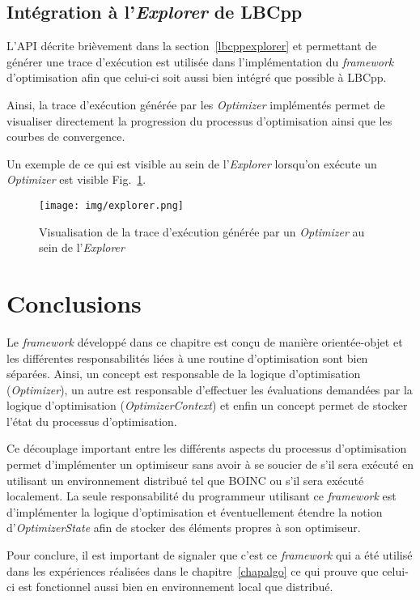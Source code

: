 \documentclass[a4paper, 12pt]{report}
\begin{document}

\subsection{Intégration à l'\textit{Explorer} de LBCpp}
L'API décrite brièvement dans la section~\ref{lbcppexplorer} et permettant de générer une trace d'exécution est utilisée dans l'implémentation du \textit{framework} d'optimisation afin que celui-ci soit aussi bien intégré que possible à LBCpp. 

Ainsi, la trace d'exécution générée par les \textit{Optimizer} implémentés permet de visualiser directement la progression du processus d'optimisation ainsi que les courbes de convergence.

Un exemple de ce qui est visible au sein de l'\textit{Explorer} lorsqu'on exécute un \textit{Optimizer} est visible Fig.~\ref{explorer}.

\begin{figure}[!tb]
\centering
\texttt{[image: img/explorer.png]}
\caption{Visualisation de la trace d'exécution générée par un \textit{Optimizer} au sein de l'\textit{Explorer}}
\label{explorer}
\end{figure}

\section{Conclusions}
Le \textit{framework} développé dans ce chapitre est conçu de manière orientée-objet et les différentes responsabilités liées à une routine d'optimisation sont bien séparées. Ainsi, un concept est responsable de la logique d'optimisation (\textit{Optimizer}), un autre est responsable d'effectuer les évaluations demandées par la logique d'optimisation (\textit{OptimizerContext}) et enfin un concept permet de stocker l'état du processus d'optimisation.

Ce découplage important entre les différents aspects du processus d'optimisation permet d'implémenter un optimiseur sans avoir à se soucier de s'il sera exécuté en utilisant un environnement distribué tel que \textsc{BOINC} ou s'il sera exécuté localement. La seule responsabilité du programmeur utilisant ce \textit{framework} est d'implémenter la logique d'optimisation et éventuellement étendre la notion d'\textit{OptimizerState} afin de stocker des éléments propres à son optimiseur.

Pour conclure, il est important de signaler que c'est ce \textit{framework} qui a été utilisé dans les expériences réalisées dans le chapitre~\ref{chapalgo} ce qui prouve que celui-ci est fonctionnel aussi bien en environnement local que distribué.
\end{document}
